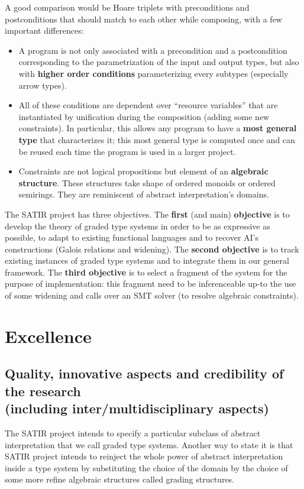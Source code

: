 \documentclass{article}[11pt]
\begin{document}
A good comparison would be Hoare triplets with preconditions and postconditions that should match to each other while composing, with a few important differences:
\begin{itemize}
\item A program is not only associated with a precondition and a postcondition corresponding to the parametrization of the input and output types, but also with {\bf higher order conditions} parameterizing every subtypes (especially arrow types).
\item All of these conditions are dependent over ``resource variables'' that are instantiated by unification during the composition (adding some new constraints). In particular, this allows any program to have a {\bf most general type} that characterizes it; this most general type is computed once and can be reused each time the program is used in a larger project.
\item Constraints are not logical propositions but element of an {\bf algebraic structure}. These structures take shape of ordered monoids or ordered semirings. They are reminiscent of abstract interpretation's domains.
\end{itemize}

The SATIR project has three objectives. The {\bf first} (and main) {\bf objective} is to develop the theory of graded type systems in order to be as expressive as possible, to adapt to existing functional languages and to recover AI's constructions (Galois relations and widening). The {\bf second objective} is to track existing instances of graded type systems and to integrate them in our general framework. The {\bf third objective} is to select a fragment of the system for the purpose of implementation: this fragment need to be inferenceable up-to the use of some widening and calls over an SMT solver (to resolve algebraic constraints).




\section{Excellence}
\subsection{Quality, innovative aspects and credibility of the research\\  (including inter/multidisciplinary aspects)}

The SATIR project intends to specify a particular subclass of abstract interpretation that we call graded type systems. Another way to state it is that SATIR project intends to reinject the whole power of abstract interpretation inside a type system by substituting the choice of the domain by the choice of some more refine algebraic structures called grading structures.
\end{document}
